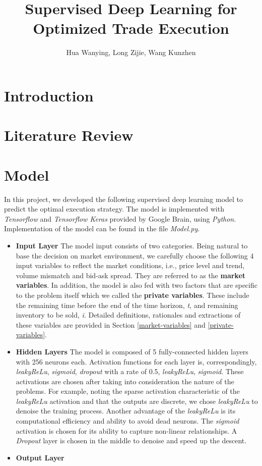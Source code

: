 \documentclass[12pt]{extarticle}
\title{Supervised Deep Learning for Optimized Trade Execution}
\author{Hua Wanying, Long Zijie, Wang Kunzhen}
\begin{document}
\maketitle

\section{Introduction}

\section{Literature Review}

\section{Model}
In this project, we developed the following supervised deep learning model to predict the
optimal execution strategy. \noindent The model is implemented with \textit{Tensorflow} and \textit{Tensorflow
Keras} provided by Google Brain, using \textit{Python}.
Implementation of the model can be found in the file \textit{Model.py}.

\begin{itemize}
\item \textbf{Input Layer} The model input consists of two categories. Being
natural to base the decision on market environment, we carefully choose the following
4 input variables to reflect the market conditions, i.e.,
price level and trend, volume mismatch and bid-ask spread. They are
referred to as the \textbf{market variables}. In addition,
the model is also fed with two factors that are specific to the problem itself which
we called the \textbf{private variables}. These include the remaining time before the end of
the time horizon, \textit{t}, and remaining inventory to be sold, \textit{i}.
Detailed definitions, rationales and extractions of these variables are
provided in Section \ref{market-variables} and \ref{private-variables}.

\item \textbf{Hidden Layers} The model is composed of 5 fully-connected hidden layers with
256 neurons each. Activation functions for each layer is, correspondingly,
\textit{leakyReLu},
\textit{sigmoid}, \textit{dropout} with a rate of 0.5,
\textit{leakyReLu}, \textit{sigmoid}. These activations are
chosen after taking into consideration the nature of the
problems. For example, noting the sparse activation characteristic of
the \textit{leakyReLu} activation and that the outputs are discrete, we chose \textit{leakyReLu}
to denoise the training process. Another advantage of the \textit{leakyReLu}
is its computational efficiency and ability to avoid dead neurons.
The \textit{sigmoid} activation is chosen for its ability to capture
non-linear relationships. A \textit{Dropout} layer is chosen
in the middle to denoise and speed up the descent. \\

\item \textbf{Output Layer} 

\end{itemize}
\end{document}
